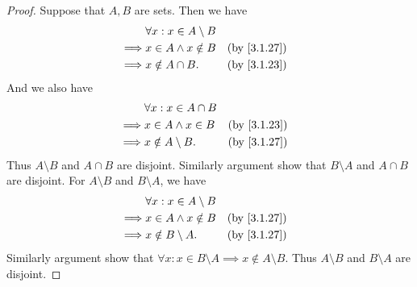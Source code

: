 \begin{proof}
  Suppose that \(A, B\) are sets.
  Then we have
  \begin{align*}
             & \forall x : x \in A \setminus B                                \\
    \implies & x \in A \land x \notin B        &  & \text{(by \cref{3.1.27})} \\
    \implies & x \notin A \cap B.              &  & \text{(by \cref{3.1.23})}
  \end{align*}
  And we also have
  \begin{align*}
             & \forall x : x \in A \cap B                                \\
    \implies & x \in A \land x \in B      &  & \text{(by \cref{3.1.23})} \\
    \implies & x \notin A \setminus B.    &  & \text{(by \cref{3.1.27})}
  \end{align*}
  Thus \(A \setminus B\) and \(A \cap B\) are disjoint.
  Similarly argument show that \(B \setminus A\) and \(A \cap B\) are disjoint.
  For \(A \setminus B\) and \(B \setminus A\), we have
  \begin{align*}
             & \forall x : x \in A \setminus B                                \\
    \implies & x \in A \land x \notin B        &  & \text{(by \cref{3.1.27})} \\
    \implies & x \notin B \setminus A.         &  & \text{(by \cref{3.1.27})}
  \end{align*}
  Similarly argument show that \(\forall x : x \in B \setminus A \implies x \notin A \setminus B\).
  Thus \(A \setminus B\) and \(B \setminus A\) are disjoint.


\end{proof}
